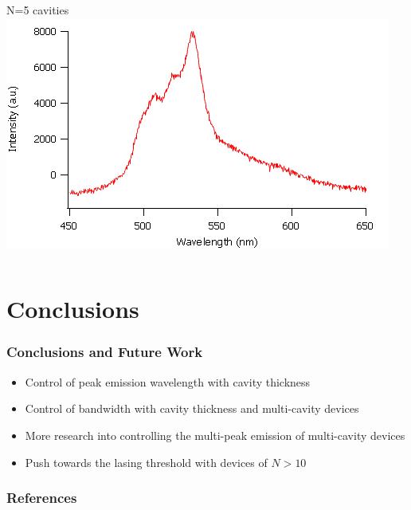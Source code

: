 \documentclass{beamer}
\begin{document}
\begin{frame}
\begin{columns}
\begin{column}{0.5\textwidth}
					N=5 cavities\\
					\includegraphics[width=\textwidth]{images/n5_fe.png}
				\end{column}
            \end{columns}
        \end{frame}
        
\section{Conclusions}
    \frame{\tableofcontents[currentsection]}
    \begin{frame}
        \frametitle{Conclusions and Future Work}
        \begin{itemize}
			\item Control of peak emission wavelength with cavity thickness
			\vspace{0.5cm}
			\item Control of bandwidth with cavity thickness and multi-cavity devices
			\vspace{0.5cm}
			\item More research into controlling the multi-peak emission of multi-cavity devices
			\vspace{0.5cm}
			\item Push towards the lasing threshold with devices of $N>10$
        \end{itemize}
    \end{frame}
    
    \begin{frame}
        \frametitle{References}
        \nocite{griffiths1999}
        \nocite{Matsushima2008}
        \nocite{Stavrinou1999}
        \nocite{Ismail2016}
        \nocite{Bulovi1998}
        \nocite{Shinar2008}
        \printbibliography[heading=none]
    \end{frame}
    
\end{document}
